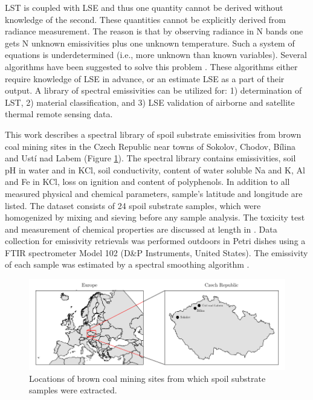 \begin{appendices}
LST is coupled with LSE and thus one quantity cannot be derived without knowledge of the second. These quantities cannot be explicitly derived from radiance measurement. The reason is that by observing radiance in N bands one gets N unknown emissivities plus one unknown temperature. Such a system of equations is underdetermined (i.e., more unknown than known variables). Several algorithms have been suggested to solve this problem \cite{LT13}. These algorithms either require knowledge of LSE in advance, or an estimate LSE as a part of their output. A library of spectral emissivities can be utilized for: 1) determination of LST, 2) material classification, and 3) LSE validation of airborne and satellite thermal remote sensing data.

This work describes a spectral library of spoil substrate emissivities from brown coal mining sites in the Czech Republic near towns of Sokolov, Chodov, Bílina and Ustí nad Labem (Figure \ref{fig:SpoilSubstratesMap}). The spectral library contains emissivities, soil pH in water and in KCl, soil conductivity, content of water soluble Na and K, Al and Fe in KCl, loss on ignition and content of polyphenols. In addition to all measured physical and chemical parameters, sample's latitude and longitude are listed. The dataset consists of 24 spoil substrate samples, which were homogenized by mixing and sieving before any sample analysis. The toxicity test and measurement of chemical properties are discussed at length in \cite{FK05}. Data collection for emissivity retrievals was performed outdoors in Petri dishes using a FTIR spectrometer Model 102 (D\&P Instruments, United States). The emissivity of each sample was estimated by a spectral smoothing algorithm \cite{HJ98}.

\begin{figure}[!t]
\centering
\includegraphics[width=0.95\linewidth]{pics/Chapter_05/map.pdf}
\vspace{1.5 em}
\caption{Locations of brown coal mining sites from which spoil substrate samples were extracted.}
\label{fig:SpoilSubstratesMap}
\end{figure}


\end{appendices}
